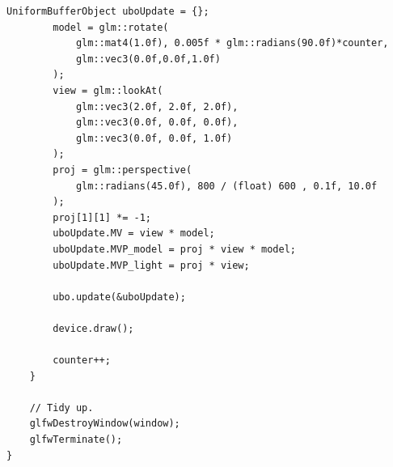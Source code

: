 \documentclass[12pt]{report}
\theoremstyle{definition}
\begin{document}
\begin{lstlisting}[caption=Multipass drawing with evulkan library., showstringspaces=false]
        UniformBufferObject uboUpdate = {};
        model = glm::rotate(
            glm::mat4(1.0f), 0.005f * glm::radians(90.0f)*counter,
            glm::vec3(0.0f,0.0f,1.0f)
        );
        view = glm::lookAt(
            glm::vec3(2.0f, 2.0f, 2.0f),
            glm::vec3(0.0f, 0.0f, 0.0f),
            glm::vec3(0.0f, 0.0f, 1.0f)
        );
        proj = glm::perspective(
            glm::radians(45.0f), 800 / (float) 600 , 0.1f, 10.0f
        );
        proj[1][1] *= -1;
        uboUpdate.MV = view * model;
        uboUpdate.MVP_model = proj * view * model;
        uboUpdate.MVP_light = proj * view;

        ubo.update(&uboUpdate);

        device.draw();

        counter++;
    }

    // Tidy up.
    glfwDestroyWindow(window);
    glfwTerminate();
}
    \end{lstlisting}
\end{document}
